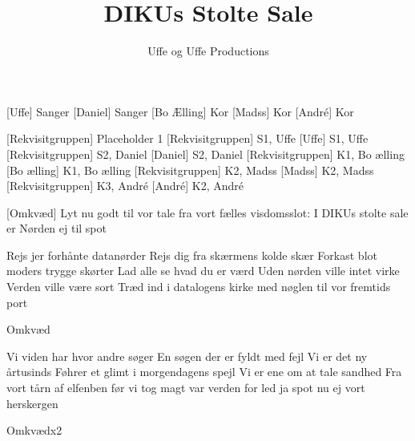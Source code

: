 \documentclass[a4paper,11pt]{article}
\title{DIKUs Stolte Sale}
\author{Uffe og Uffe Productions\texttrademark}
\begin{document}
\maketitle

\begin{roles}  
[Uffe] Sanger
[Daniel] Sanger
[Bo Ælling] Kor
[Madss] Kor
[André] Kor
\end{roles}

\begin{props}
[Rekvisitgruppen] Placeholder 1
[Rekvisitgruppen] S1, Uffe 
[Uffe] S1, Uffe
[Rekvisitgruppen] S2, Daniel 
[Daniel] S2, Daniel 
[Rekvisitgruppen] K1, Bo ælling 
[Bo ælling] K1, Bo ælling 
[Rekvisitgruppen] K2, Madss 
[Madss] K2, Madss 
[Rekvisitgruppen] K3, André 
[André] K2, André 
\end{props}

\begin{song}
  [Omkvæd]
Lyt nu godt til vor tale
fra vort fælles visdomsslot:
I DIKUs stolte sale 
er Nørden ej til spot

 Rejs jer forhånte datanørder
Rejs dig fra skærmens kolde skær
Forkast blot moders trygge skørter
Lad alle se hvad du er værd
Uden nørden ville intet virke
Verden ville være sort
Træd ind i datalogens kirke
med nøglen til vor fremtids port

 Omkvæd

 Vi viden har hvor andre søger
En søgen der er fyldt med fejl
Vi er det ny årtusinds Føhrer
et glimt i morgendagens spejl
Vi er ene om at tale sandhed
Fra vort tårn af elfenben
før vi tog magt var verden for led
ja spot nu ej vort herskergen

 Omkvædx2
\end{song}
\end{document}
